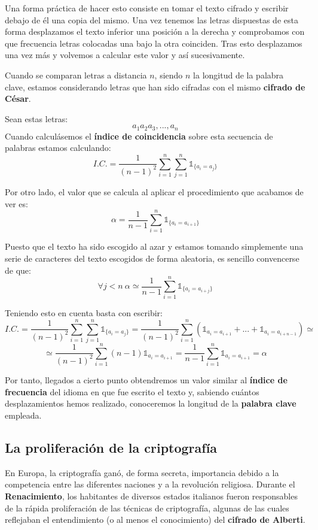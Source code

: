 \documentclass[nochap]{apuntesURJC}
\begin{document}
Una forma práctica de hacer esto consiste en tomar el texto cifrado y escribir debajo de él una copia del mismo. Una vez tenemos las letras dispuestas de esta forma desplazamos el texto inferior una posición a la derecha y comprobamos con que frecuencia letras colocadas una bajo la otra coinciden. Tras esto desplazamos una vez más y volvemos a calcular este valor y así sucesivamente.

Cuando se comparan letras a distancia $n$, siendo $n$ la longitud de la palabra clave, estamos considerando letras que han sido cifradas con el mismo \textbf{cifrado de César}.

Sean estas letras:
\[a_1a_2a_3,...,a_n\]
Cuando calculásemos el \textbf{índice de coincidencia} sobre esta secuencia de palabras estamos calculando:
\[I.C. = \frac{1}{(n-1)^2}\sum_{i=1}^n\sum_{j=1}^n\mathbb{1}_{\{a_i=a_j\}}\]

Por otro lado, el valor que se calcula al aplicar el procedimiento que acabamos de ver es:
\[α = \frac{1}{n-1} \sum_{i=1}^n \mathbb{1}_{\{a_i=a_{i+1}\}}\]

Puesto que el texto ha sido escogido al azar y estamos tomando simplemente una serie de caracteres del texto escogidos de forma aleatoria, es sencillo convencerse de que:
\[\forall j < n \ α \simeq \frac{1}{n-1}\sum_{i=1}^n\mathbb{1}_{\{a_i=a_{i+j}\}}\]

Teniendo esto en cuenta basta con escribir:
\[I.C. = \frac{1}{(n-1)^2}\sum_{i=1}^n\sum_{j=1}^n\mathbb{1}_{\{a_i=a_j\}} = \frac{1}{(n-1)^2}\sum_{i=1}^n \left( \mathbb{1}_{a_i=a_{i+1}} + ... + \mathbb{1}_{a_i=a_{i+n-1}}\right)\simeq\]
\[\simeq \frac{1}{(n-1)^2}\sum_{i=1}^n(n-1)\mathbb{1}_{a_i=a_{i+1}} = \frac{1}{n-1}\sum_{i=1}^n\mathbb{1}_{a_i=a_{i+1}}=α\]

Por tanto, llegados a cierto punto obtendremos un valor similar al \textbf{índice de frecuencia} del idioma en que fue escrito el texto y, sabiendo cuántos desplazamientos hemos realizado, conoceremos la longitud de la \textbf{palabra clave} empleada.

\subsection{La proliferación de la criptografía}
En Europa, la criptografía ganó, de forma secreta, importancia debido a la competencia entre las diferentes naciones y a la revolución religiosa. Durante el \textbf{Renacimiento}, los habitantes de diversos estados italianos  fueron responsables de la rápida proliferación de las técnicas de criptografía, algunas de las cuales reflejaban el entendimiento (o al menos el conocimiento) del \textbf{cifrado de Alberti}.
\end{document}
